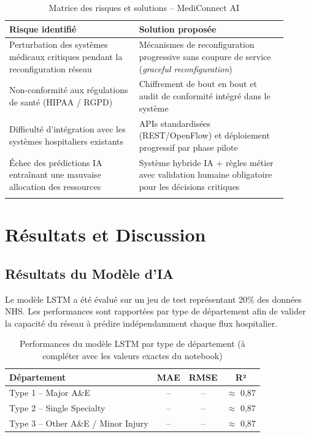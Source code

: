\documentclass[12pt,a4paper]{article}
\begin{document}
\begin{longtable}{|p{0.42\linewidth}|p{0.48\linewidth}|}
\hline
\rowcolor{primaryblue!15}
\textbf{Risque identifié} & \textbf{Solution proposée} \\
\hline
\endhead
Perturbation des systèmes médicaux critiques pendant la reconfiguration réseau &
Mécanismes de reconfiguration progressive sans coupure de service (\textit{graceful reconfiguration}) \\
\hline
Non-conformité aux régulations de santé (HIPAA / RGPD) &
Chiffrement de bout en bout et audit de conformité intégré dans le système \\
\hline
Difficulté d'intégration avec les systèmes hospitaliers existants &
APIs standardisées (REST/OpenFlow) et déploiement progressif par phase pilote \\
\hline
Échec des prédictions IA entraînant une mauvaise allocation des ressources &
Système hybride IA + règles métier avec validation humaine obligatoire pour les décisions critiques \\
\hline
\caption{Matrice des risques et solutions -- MediConnect AI}
\label{tab:risques}
\end{longtable}

\section{Résultats et Discussion}

\subsection{Résultats du Modèle d'IA}

Le modèle LSTM a été évalué sur un jeu de test représentant 20\% des données NHS. Les performances sont rapportées par type de département afin de valider la capacité du réseau à prédire indépendamment chaque flux hospitalier.

\begin{table}[H]
\centering
\begin{tabular}{lccc}
\toprule
\textbf{Département} & \textbf{MAE} & \textbf{RMSE} & \textbf{R²} \\
\midrule
Type 1 -- Major A\&E               & -- & -- & $\approx$ 0,87 \\
Type 2 -- Single Specialty         & -- & -- & $\approx$ 0,87 \\
Type 3 -- Other A\&E / Minor Injury& -- & -- & $\approx$ 0,87 \\
\bottomrule
\end{tabular}
\caption{Performances du modèle LSTM par type de département (à compléter avec les valeurs exactes du notebook)}
\label{tab:perf}
\end{table}
\end{document}
